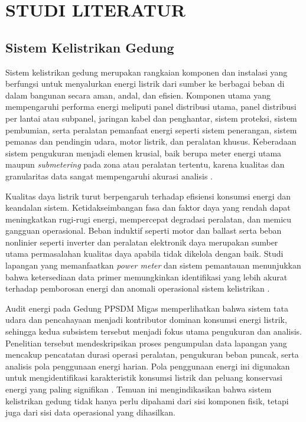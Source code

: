 \chapter{STUDI LITERATUR}
\label{chap:studi-literatur}

\section{Sistem Kelistrikan Gedung}
Sistem kelistrikan gedung merupakan rangkaian komponen dan instalasi yang berfungsi untuk menyalurkan energi listrik dari sumber ke berbagai beban di dalam bangunan secara aman, andal, dan efisien. Komponen utama yang mempengaruhi performa energi meliputi panel distribusi utama, panel distribusi per lantai atau subpanel, jaringan kabel dan penghantar, sistem proteksi, sistem pembumian, serta peralatan pemanfaat energi seperti sistem penerangan, sistem pemanas dan pendingin udara, motor listrik, dan peralatan khusus. Keberadaan sistem pengukuran menjadi elemen krusial, baik berupa meter energi utama maupun \textit{submetering} pada zona atau peralatan tertentu, karena kualitas dan granularitas data sangat mempengaruhi akurasi analisis \cite{hamdani2017audit}.

Kualitas daya listrik turut berpengaruh terhadap efisiensi konsumsi energi dan keandalan sistem. Ketidakseimbangan fasa dan faktor daya yang rendah dapat meningkatkan rugi-rugi energi, mempercepat degradasi peralatan, dan memicu gangguan operasional. Beban induktif seperti motor dan ballast serta beban nonlinier seperti inverter dan peralatan elektronik daya merupakan sumber utama permasalahan kualitas daya apabila tidak dikelola dengan baik. Studi lapangan yang memanfaatkan \textit{power meter} dan sistem pemantauan menunjukkan bahwa ketersediaan data primer memungkinkan identifikasi yang lebih akurat terhadap pemborosan energi dan anomali operasional sistem kelistrikan \cite{hamdani2017audit}.

Audit energi pada Gedung PPSDM Migas memperlihatkan bahwa sistem tata udara dan pencahayaan menjadi kontributor dominan konsumsi energi listrik, sehingga kedua subsistem tersebut menjadi fokus utama pengukuran dan analisis. Penelitian tersebut mendeskripsikan proses pengumpulan data lapangan yang mencakup pencatatan durasi operasi peralatan, pengukuran beban puncak, serta analisis pola penggunaan energi harian. Pola penggunaan energi ini digunakan untuk mengidentifikasi karakteristik konsumsi listrik dan peluang konservasi energi yang paling signifikan \cite{winarto2019audit}. Temuan ini mengindikasikan bahwa sistem kelistrikan gedung tidak hanya perlu dipahami dari sisi komponen fisik, tetapi juga dari sisi data operasional yang dihasilkan.

